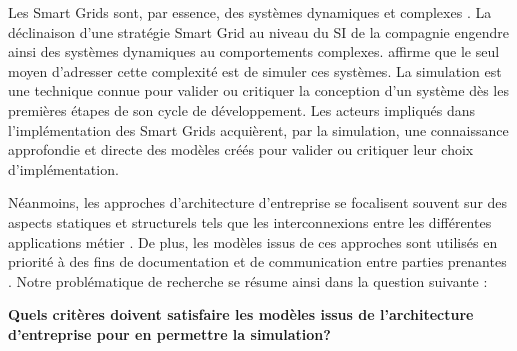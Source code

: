 
Les Smart Grids sont, par essence, des systèmes  dynamiques et complexes \cite{monti_power_2010}. La déclinaison d'une stratégie Smart Grid au niveau du SI de la compagnie engendre ainsi des systèmes dynamiques au comportements complexes. \cite{borshchev2004system} affirme que le seul moyen d'adresser cette complexité est  de simuler ces systèmes. La simulation est une technique connue pour valider ou critiquer la conception d'un système dès les premières étapes de son cycle de développement. Les acteurs impliqués dans l'implémentation des Smart Grids acquièrent, par la  simulation, une connaissance approfondie et directe des modèles créés pour valider ou critiquer leur choix d'implémentation.

Néanmoins, les approches d'architecture d'entreprise se focalisent souvent sur des aspects statiques et structurels tels que les interconnexions entre les différentes applications métier \cite{buckl2008towards}. De plus, les modèles issus de ces approches sont utilisés en priorité à des fins de documentation et de communication entre parties prenantes \cite{kulkarni2013modelling}. Notre problématique de recherche se résume ainsi dans la question suivante :

\textbf{Quels critères doivent satisfaire les modèles issus de l'architecture d'entreprise pour en permettre la simulation?}
     
